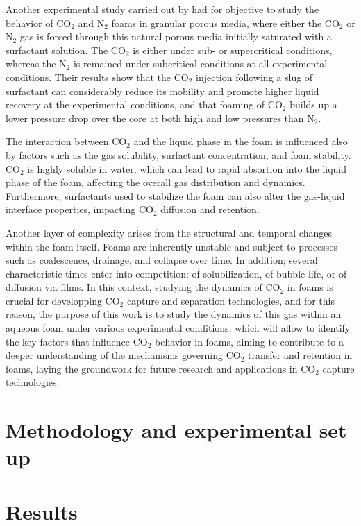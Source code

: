 \documentclass{article}
\begin{document}
Another experimental study carried out by \cite{farajzadeh2009comparative} had for objective to study the behavior of CO$_2$ and N$_2$ foams in granular porous media, where either the CO$_2$ or N$_2$ gas is forced through this natural porous media initially saturated with a surfactant solution. The CO$_2$ is either under sub- or supercritical conditions, whereas the N$_2$ is remained under subcritical conditions at all experimental conditions. Their results show that the CO$_2$ injection following a slug of surfactant can considerably reduce its mobility and promote higher liquid recovery at the experimental conditions, and that foaming of CO$_2$ builds up a lower pressure drop over the core at both high and low pressures than N$_2$.

The interaction between CO$_2$ and the liquid phase in the foam is influenced also by factors such as the gas solubility, surfactant concentration, and foam stability. CO$_2$ is highly soluble in water, which can lead to rapid absortion into the liquid phase of the foam, affecting the overall gas distribution and dynamics. Furthermore, surfactants used to stabilize the foam can also alter the gas-liquid interface properties, impacting CO$_2$ diffusion and retention. 

Another layer of complexity arises from the structural and temporal changes within the foam itself. Foams are inherently unstable and subject to processes such as coalescence, drainage, and collapse over time. In addition; several characteristic times enter into competition: of solubilization, of bubble life, or of diffusion via films. In this context, studying the dynamics of CO$_2$ in foams is crucial for developping CO$_2$ capture and separation technologies, and for this reason, the purpose of this work is to study the dynamics of this gas within an aqueous foam under various experimental conditions, which will allow to identify the key factors that influence CO$_2$ behavior in foams, aiming to contribute to a deeper understanding of the mechanisms governing CO$_2$ transfer and retention in foams, laying the groundwork for future research and applications in CO$_2$ capture technologies.  

\section{Methodology and experimental set up}



\section{Results}
\end{document}
